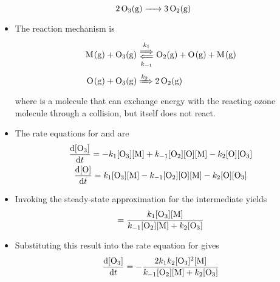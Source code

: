 \documentclass[../notes.tex]{subfiles}
\begin{document}
\begin{itemize}
    \begin{equation*}
        \ce{2O3(g) -> 3O2(g)}
    \end{equation*}
    \begin{itemize}
        \item The reaction mechanism is
        \begin{align*}
            \ce{M(g) + O3(g)} &\Longleftrightarrows[k_1][k_{-1}] \ce{O2(g) + O(g) + M(g)}\\
            \ce{O(g) + O3(g)} &\xRightarrow{k_2} \ce{2O2(g)}
        \end{align*}
        where  is a molecule that can exchange energy with the reacting ozone molecule through a collision, but  itself does not react.
        \item The rate equations for  and  are
        \begin{gather*}
            \dv{[\ce{O3}]}{t} = -k_1[\ce{O3}][\ce{M}]+k_{-1}[\ce{O2}][\ce{O}][\ce{M}]-k_2[\ce{O}][\ce{O3}]\\
            \dv{[\ce{O}]}{t} = k_1[\ce{O3}][\ce{M}]-k_{-1}[\ce{O2}][\ce{O}][\ce{M}]-k_2[\ce{O}][\ce{O3}]
        \end{gather*}
        \item Invoking the steady-state approximation for the intermediate  yields
        \begin{equation*}
            [\ce{O}] = \frac{k_1[\ce{O3}][\ce{M}]}{k_{-1}[\ce{O2}][\ce{M}]+k_2[\ce{O3}]}
        \end{equation*}
        \item Substituting this result into the rate equation for  gives
        \begin{equation*}
            \dv{[\ce{O3}]}{t} = -\frac{2k_1k_2[\ce{O3}]^2[\ce{M}]}{k_{-1}[\ce{O2}][\ce{M}]+k_2[\ce{O3}]}
        \end{equation*}
    \end{itemize}
\end{itemize}
\end{document}
